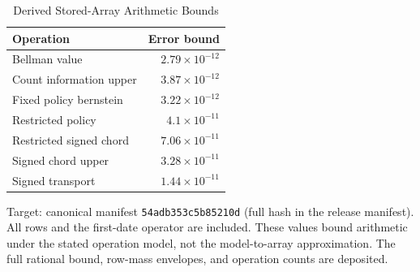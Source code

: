 \begin{table}[t]
\caption{Derived Stored-Array Arithmetic Bounds}\label{tab:arithmetic}
\centering
\footnotesize
\begin{tabular}{@{}lr@{}}
\toprule
Operation & Error bound \\
\midrule
Bellman value & $2.79\times10^{-12}$ \\
Count information upper & $3.87\times10^{-12}$ \\
Fixed policy bernstein & $3.22\times10^{-12}$ \\
Restricted policy & $4.1\times10^{-11}$ \\
Restricted signed chord & $7.06\times10^{-11}$ \\
Signed chord upper & $3.28\times10^{-11}$ \\
Signed transport & $1.44\times10^{-11}$ \\
\bottomrule
\end{tabular}
\par\smallskip\begin{minipage}{\linewidth}\footnotesize Target: canonical manifest \texttt{54adb353c5b85210d} (full hash in the release manifest). All rows and the first-date operator are included. These values bound arithmetic under the stated operation model, not the model-to-array approximation. The full rational bound, row-mass envelopes, and operation counts are deposited.\end{minipage}
\end{table}
